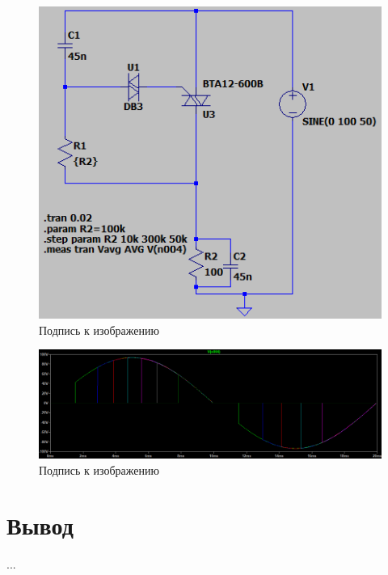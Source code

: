 \documentclass[a4paper, 12pt]{article}
\begin{document}
    \begin{figure}[H]
        \centering
        \includegraphics[scale=0.5]{scheme6.png}
        \captionsetup{skip=0pt}
        \caption{Подпись к изображению}
        \label{fig:scheme6}
    \end{figure}


    \begin{figure}[H]
        \centering
        \includegraphics[scale=0.45]{R2_C45u.png}
        \captionsetup{skip=0pt}
        \caption{Подпись к изображению}
        \label{fig:R2_C45u}
    \end{figure}


    \section{Вывод}
    ...
\end{document}
